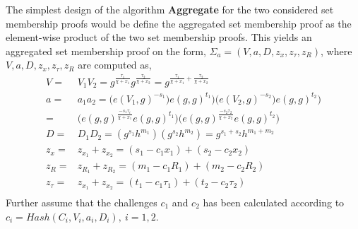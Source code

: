 
The simplest design of the algorithm \textbf{Aggregate} for the two considered set membership proofs would be define the aggregated set membership proof as the element-wise product of the two set membership proofs. This yields an aggregated set membership proof on the form, $\Sigma_a = (V,a,D,z_{x},z_{\tau },z_{R})$,  where $V, a, D,z_{x},z_{\tau },z_{R}$ are computed as,
\begin{equation}
\begin{aligned}
\label{eq:naiveAgg}
V =& V_1V_2 = g^{\frac{\tau_1}{\chi + x_1}}g^{\frac{\tau_2}{\chi + x_2}}  = g^{\frac{\tau_1}{\chi + x_1} + \frac{\tau_2}{\chi + x_2}}  \\
a =& a_1a_2 = \big(e(V_1,g)^{-s_1})e(g,g)^{t_1}\big)  \big(e(V_2,g)^{-s_2})e(g,g)^{t_2}\big) \\
=&  \big( e(g,g)^{\frac{-s_1\tau_i}{\chi+x_1}}e(g,g)^{t_1}\big) \big( e(g,g)^{\frac{-s_2\tau_2}{\chi+x_2}}e(g,g)^{t_2}\big) \\
D =& D_1D_2 = ( g^{s_1}h^{m_1} ) (g^{s_2} h^{m_2}) = g^{s_1+s_2}h^{m_1+m_2}\\
z_x =& z_{x_1} + z_{x_2} = (s_1-c_1x_1)+(s_2-c_2x_2)\\
z_R =& z_{R_1} + z_{R_2} = (m_1-c_1R_1)+(m_2-c_2R_2)\\
z_\tau =& z_{x_1} + z_{x_2} = (t_1-c_1\tau_1)+(t_2-c_2\tau_2)\\ 
\end{aligned} 
\end{equation}
Further assume that the  challenges $c_1$ and $c_2$ has been calculated according to $c_i=Hash(C_i,V_i,a_i,D_i),\: i=1,2$.


